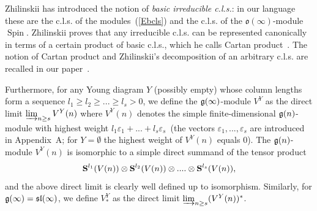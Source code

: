 \documentclass{emsprocart}
\begin{document}
Zhilinskii has introduced the notion of {\it basic irreducible c.l.s.}: in our language these are the c.l.s. of the modules~(\ref{Ebcls}) and the c.l.s. of the $\mathfrak o(\infty)$-module $\operatorname{Spin}$. Zhilinskii proves that any irreducible c.l.s. can be represented canonically in terms of a certain product of basic c.l.s., which he calls Cartan product~\cite{Zh1}. The notion of Cartan product and Zhilinskii's decomposition of an arbitrary c.l.s. are recalled in our paper~\cite[Section 7.1-7.2]{PP1}.

Furthermore, for any Young diagram $Y$ (possibly empty) whose column lengths form a sequence  $l_1\ge l_2\ge...\ge l_s>0$, we define the $\frak g(\infty)$-module $V^Y$ as the direct limit $\varinjlim_{n\ge s} V^Y(n)$ where $V^Y(n)$ denotes the simple finite-dimensional $\frak g(n)$-module with highest weight $l_1\varepsilon_1+...+l_s\varepsilon_s$~(the vectors $\varepsilon_1,..., \varepsilon_s$ are introduced in Appendix~A; for $Y=\emptyset$ the highest weight of $V^Y(n)$ equals 0). The $\frak g(n)$-module $V^Y(n)$ is isomorphic to a simple direct summand of the tensor product $$\operatorname{\bf S}^{l_1}(V(n))\otimes\operatorname{\bf S}^{l_2}(V(n))\otimes....\otimes\operatorname{\bf S}^{l_s}(V(n)),$$ and the above direct limit is clearly well defined up to isomorphism. Similarly, for $\frak g(\infty)=\frak{sl}(\infty)$, we define $V^Y_*$ as the direct limit $\varinjlim_{n\ge s}(V^Y(n))^*$.
\end{document}
